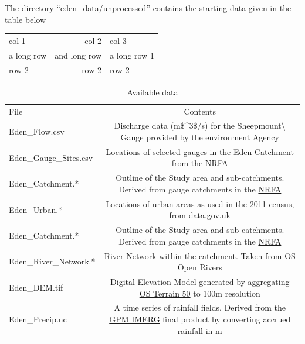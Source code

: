 \documentclass[]{article}
\begin{document}
The directory ``eden\_data/unprocessed'' contains the starting data given in the
table below

\begin{table}
\begin{tabular}{lrl}
col 1 & col 2 & col 3 \\
a long row & and long row & a long row 1 \\
row 2 & row 2 & row 2 \\
\end{tabular}
\end{table}

\begin{table}
\caption{
\label{tab:simple} Available data
}

\begin{tabular}{lc}
File & Contents \\
Eden\_Flow.csv & Discharge data (m\$\^{}3\$/s) for the Sheepmount\textbackslash{} Gauge provided by the environment Agency \\
Eden\_Gauge\_Sites.csv & Locations of selected gauges in the Eden Catchment from the \href{https://nrfa.ceh.ac.uk/data/search}{NRFA} \\
Eden\_Catchment.* & Outline of the Study area and sub-catchments. Derived from gauge catchments in the \href{https://nrfa.ceh.ac.uk/data/search}{NRFA} \\
Eden\_Urban.* & Locations of urban areas as used in the 2011 census, from \href{https://data.gov.uk/dataset/15e3be7f-66ed-416c-b0f2-241e87668642/built-up-areas-december-2011-boundaries-v2}{data.gov.uk} \\
Eden\_Catchment.* & Outline of the Study area and sub-catchments. Derived from gauge catchments in the \href{https://nrfa.ceh.ac.uk/data/search}{NRFA} \\
Eden\_River\_Network.* & River Network within the catchment. Taken from \href{https://www.ordnancesurvey.co.uk/business-government/products/open-map-rivers}{OS Open Rivers} \\
Eden\_DEM.tif & Digital Elevation Model generated by aggregating \href{https://www.ordnancesurvey.co.uk/business-government/products/terrain-50}{OS Terrain 50} to 100m resolution \\
Eden\_Precip.nc & A time series of rainfall fields. Derived from the \href{https://gpm.nasa.gov/data/imerg}{GPM IMERG} final product by converting accrued rainfall in m \\
\end{tabular}
\end{table}
\end{document}
